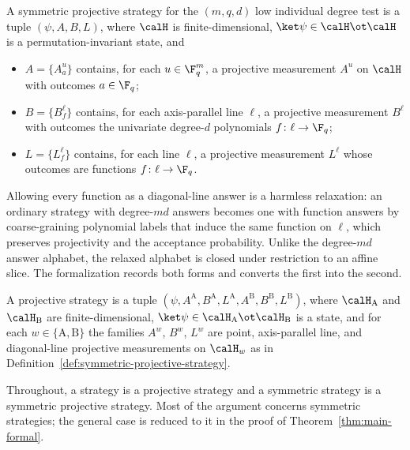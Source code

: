 \begin{definition}\label{def:symmetric-projective-strategy}
	\leanok
	A symmetric projective strategy for the $(m,q,d)$ low individual degree
	test is a tuple $(\psi,A,B,L)$, where $\calH$ is finite-dimensional,
	$\ket\psi\in\calH\ot\calH$ is a permutation-invariant state, and
	\begin{itemize}
		\item $A=\{A^u_a\}$ contains, for each $u\in\F_q^m$, a projective
		      measurement $A^u$ on $\calH$ with outcomes $a\in\F_q$;
		\item $B=\{B^\ell_f\}$ contains, for each axis-parallel line $\ell$, a
		      projective measurement $B^\ell$ with outcomes the univariate
		      degree-$d$ polynomials $f\colon\ell\to\F_q$;
		\item $L=\{L^\ell_f\}$ contains, for each line $\ell$, a projective
		      measurement $L^\ell$ whose outcomes are functions $f\colon\ell\to\F_q$.
	\end{itemize}
	Allowing every function as a diagonal-line answer is a harmless
	relaxation: an ordinary strategy with degree-$md$ answers becomes one with
	function answers by coarse-graining polynomial labels that induce the same
	function on $\ell$, which preserves projectivity and the acceptance
	probability.  Unlike the degree-$md$ answer alphabet, the relaxed alphabet
	is closed under restriction to an affine slice.  The formalization records
	both forms and converts the first into the second.
\end{definition}

\begin{definition}\label{def:projective-strategy}
	\leanok
	A projective strategy is a tuple
	$(\psi,A^{\mathrm A},B^{\mathrm A},L^{\mathrm A},A^{\mathrm B},B^{\mathrm B},L^{\mathrm B})$,
	where $\calH_{\mathrm A}$ and $\calH_{\mathrm B}$ are finite-dimensional,
	$\ket\psi\in\calH_{\mathrm A}\ot\calH_{\mathrm B}$ is a state, and for each
	$w\in\{\mathrm A,\mathrm B\}$ the families $A^w$, $B^w$, $L^w$ are point,
	axis-parallel line, and diagonal-line projective measurements on
	$\calH_w$ as in Definition~\ref{def:symmetric-projective-strategy}.
\end{definition}

\begin{remark}\label{rem:strategy-convention}
	Throughout, a strategy is a projective strategy and a symmetric strategy is
	a symmetric projective strategy.  Most of the argument concerns symmetric
	strategies; the general case is reduced to it in the proof of
	Theorem~\ref{thm:main-formal}.
\end{remark}


